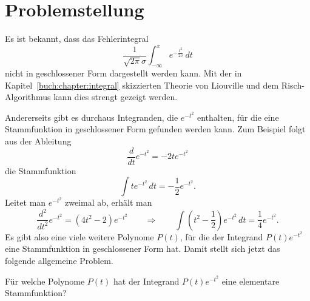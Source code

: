 %
%
%
\section{Problemstellung\label{dreieck:section:problemstellung}}
Es ist bekannt, dass das Fehlerintegral
\[
\frac{1}{\sqrt{2\pi}\sigma} \int_{-\infty}^x e^{-\frac{t^2}{2\sigma}}\,dt
\]
nicht in geschlossener Form dargestellt werden kann.
Mit der in Kapitel~\ref{buch:chapter:integral} skizzierten Theorie von
Liouville und dem Risch-Algorithmus kann dies strengt gezeigt werden.

Andererseits gibt es durchaus Integranden, die $e^{-t^2}$ enthalten,
für die eine Stammfunktion in geschlossener Form gefunden werden kann.
Zum Beispiel folgt aus der Ableitung
\[
\frac{d}{dt} e^{-t^2}
=
-2te^{-t^2}
\]
die Stammfunktion
\[
\int te^{-t^2}\,dt
=
-\frac12 e^{-t^2}.
\]
Leitet man $e^{-t^2}$ zweimal ab, erhält man
\[
\frac{d^2}{dt^2} e^{-t^2}
=
(4t^2-2) e^{-t^2}
\qquad\Rightarrow\qquad
\int (t^2-\frac12) e^{-t^2}\,dt
=
\frac14
e^{-t^2}.
\]
Es gibt also eine viele weitere Polynome $P(t)$, für die der Integrand
$P(t)e^{-t^2}$ eine Stammfunktion in geschlossener Form hat.
Damit stellt sich jetzt das folgende allgemeine Problem.

\begin{problem}
\label{dreieck:problem}
Für welche Polynome $P(t)$ hat der Integrand $P(t)e^{-t^2}$
eine elementare Stammfunktion?
\end{problem}

